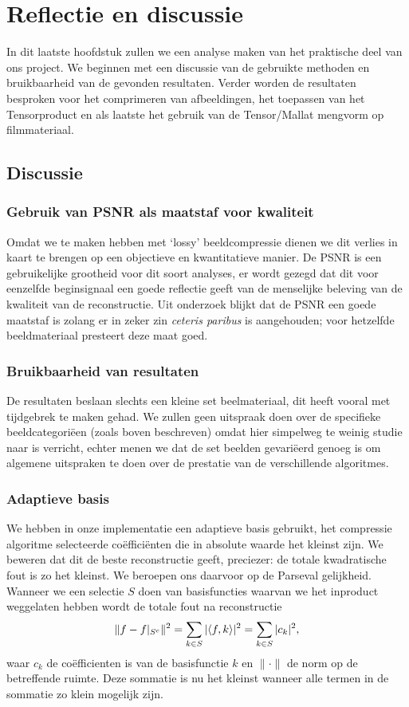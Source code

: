 \chapter{Reflectie en discussie}
\label{discH}
In dit laatste hoofdstuk zullen we een analyse maken van het praktische deel van ons project.
We beginnen met een discussie van de gebruikte methoden en bruikbaarheid van de gevonden resultaten.
Verder worden de resultaten besproken voor het comprimeren van afbeeldingen, het toepassen van het 
Tensorproduct en als laatste het gebruik van de Tensor/Mallat mengvorm op filmmateriaal. 

\section{Discussie}
\subsection{Gebruik van PSNR als maatstaf voor kwaliteit}
Omdat we te maken hebben met `lossy' beeldcompressie dienen we dit verlies in kaart te brengen op een 
objectieve en kwantitatieve manier. 
De PSNR is een gebruikelijke grootheid voor dit soort analyses, er wordt gezegd dat dit voor eenzelfde 
beginsignaal een goede reflectie geeft van de menselijke beleving van de kwaliteit van de reconstructie.
Uit onderzoek\cite{PSNR} blijkt dat de PSNR een goede maatstaf is zolang er in zeker zin \emph{ceteris paribus}
is aangehouden; voor hetzelfde beeldmateriaal presteert deze maat goed.

\subsection{Bruikbaarheid van resultaten}

De resultaten beslaan slechts een kleine set beelmateriaal, dit heeft vooral met tijdgebrek te maken gehad.
We zullen geen uitspraak doen over de specifieke beeldcategori\"een (zoals boven beschreven) 
omdat hier simpelweg te weinig studie naar is verricht, echter menen we dat de set beelden gevari\"eerd 
genoeg is om algemene uitspraken te doen over de prestatie van de verschillende algoritmes.

\subsection{Adaptieve basis}
\label{adaptief_parseval}
We hebben in onze implementatie een adaptieve basis gebruikt, het compressie algoritme selecteerde co\"effici\"enten
die in absolute waarde het kleinst zijn. 
We beweren dat dit de beste reconstructie geeft, preciezer: de totale kwadratische fout is zo het kleinst.
We beroepen ons daarvoor op de Parseval gelijkheid. Wanneer we een selectie $S$ doen van basisfuncties
waarvan we het inproduct weggelaten hebben wordt de totale fout na reconstructie
\[
\|f-f|_{S^c}\|^2 = \sum_{k\in S} |\langle f , k \rangle|^2 = \sum_{k\in S} |c_k|^2,
\]
waar $c_k$ de co\"efficienten is van de basisfunctie $k$ en $\|\cdot\|$ de norm op de betreffende ruimte. 
Deze sommatie is nu het kleinst wanneer alle termen in de sommatie zo klein mogelijk zijn. 

